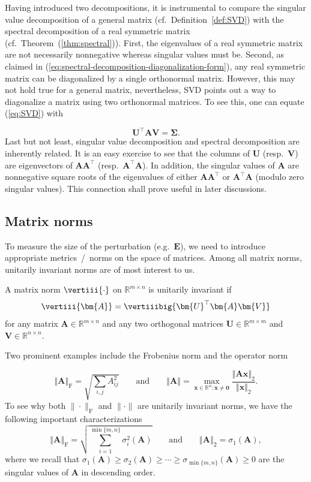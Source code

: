 Having introduced two decompositions, it is instrumental to compare
the singular value decomposition of a general matrix (cf.~Definition~\ref{def:SVD})
with the spectral decomposition of a real symmetric matrix (cf.~Theorem~(\ref{thm:spectral})).
First, the eigenvalues of a real symmetric matrix are not necessarily
nonnegative whereas singular values must be. Second, as claimed in
(\ref{eq:spectral-decomposition-diagonalization-form}), any real
symmetric matrix can be diagonalized by a single orthonormal matrix.
However, this may not hold true for a general matrix, nevertheless,
SVD points out a way to diagonalize a matrix using two orthonormal
matrices. To see this, one can equate (\ref{eq:SVD}) with

\[
\bm{U}^{\top}\bm{A}\bm{V}=\bm{\Sigma}.
\]
Last but not least, singular value decomposition and spectral decomposition
are inherently related. It is an easy exercise to see that the columns
of $\bm{U}$ (resp.~$\bm{V}$) are eigenvectors of $\bm{A}\bm{A}^{\top}$
(resp.~$\bm{A}^{\top}\bm{A}$). In addition, the singular values
of $\bm{A}$ are nonnegative square roots of the eigenvalues of either
$\bm{A}\bm{A}^{\top}$ or $\bm{A}^{\top}\bm{A}$ (modulo zero singular
values). This connection shall prove useful in later discussions.

\subsection{Matrix norms}

To measure the size of the perturbation (e.g.~$\bm{E}$), we need
to introduce appropriate metrics~/~norms on the space of matrices.
Among all matrix norms, unitarily invariant norms are of most interest
to us. \begin{definition}A matrix norm
$\vertiii{\cdot}$ on $\mathbb{R}^{m\times n}$ is unitarily invariant
if
\[
\vertiii{\bm{A}}=\vertiiibig{\bm{U}^{\top}\bm{A}\bm{V}}
\]
for any matrix $\bm{A}\in\mathbb{R}^{m\times n}$ and any two orthogonal
matrices $\bm{U}\in\mathbb{R}^{m\times m}$ and $\bm{V}\in\mathbb{R}^{n\times n}$.
\end{definition}

Two prominent examples include the Frobenius norm and the operator
norm

\begin{equation}
\left\Vert \bm{A}\right\Vert _{\mathrm{F}}=\sqrt{\sum_{i,j}A_{ij}^{2}}\qquad\text{and}\qquad\left\Vert \bm{A}\right\Vert =\max_{\bm{x}\in\mathbb{R}^{n}:\bm{x}\neq\bm{0}}\frac{\left\Vert \bm{A}\bm{x}\right\Vert _{2}}{\left\Vert \bm{x}\right\Vert _{2}}.\label{eq:def-fro-op-norm}
\end{equation}
To see why both $\|\cdot\|_{\mathrm{F}}$ and $\|\cdot\|$ are unitarily
invariant norms, we have the following important characterizations
\[
\left\Vert \bm{A}\right\Vert _{\mathrm{F}}=\sqrt{\sum_{i=1}^{\min\{m,n\}}\sigma_{i}^{2}\left(\bm{A}\right)}\qquad\text{and}\qquad\left\Vert \bm{A}\right\Vert _{\mathsf{2}}=\sigma_{1}\left(\bm{A}\right),
\]
where we recall that $\sigma_{1}(\bm{A})\geq\sigma_{2}(\bm{A})\geq\cdots\geq\sigma_{\min\{m,n\}}(\bm{A})\geq0$
are the singular values of $\bm{A}$ in descending order.

